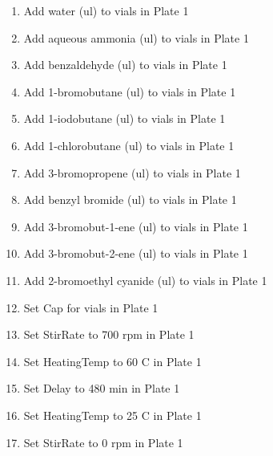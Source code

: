 \documentclass[sn-nature, twocolumn]{sn-jnl}%
\theoremstyle{thmstyleone}%
\theoremstyle{thmstyletwo}%
\theoremstyle{thmstylethree}%
\begin{document}
\begin{enumerate}[itemsep=0pt]
    \item Add water (ul) to vials in Plate 1
    \item Add aqueous ammonia (ul) to vials in Plate 1
    \item Add benzaldehyde (ul) to vials in Plate 1
    \item Add 1-bromobutane (ul) to vials in Plate 1
    \item Add 1-iodobutane (ul) to vials in Plate 1
    \item Add 1-chlorobutane (ul) to vials in Plate 1
    \item Add 3-bromopropene (ul) to vials in Plate 1
    \item Add benzyl bromide (ul) to vials in Plate 1
    \item Add 3-bromobut-1-ene (ul) to vials in Plate 1
    \item Add 3-bromobut-2-ene (ul) to vials in Plate 1
    \item Add 2-bromoethyl cyanide (ul) to vials in Plate 1
    \item Set Cap for vials in Plate 1
    \item Set StirRate to 700 rpm in Plate 1
    \item Set HeatingTemp to 60 C in Plate 1
    \item Set Delay to 480 min in Plate 1
    \item Set HeatingTemp to 25 C in Plate 1
    \item Set StirRate to 0 rpm in Plate 1
\end{enumerate}
\end{document}
